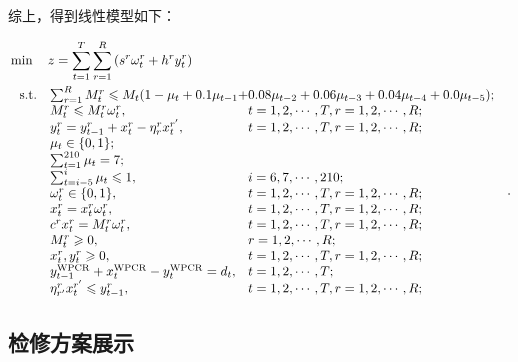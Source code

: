 综上，得到线性模型如下：

\begin{equation}\label{三模型}
	\begin{aligned}
&\min \quad z  = \sum_{t  = 1}^{T} \sum_{r = 1}^{R}\left(s^{r} \omega_{t}^{r}+h^{r} y_{t}^{r}\right)\\
& \ \begin{array}{r@{\quad}l@{}l@{\quad}l}
\mathrm{s.t. }
&	\sum_{r=1}^{R} M_{t}^{r} \leqslant M_{t}(1-\mu_{t}+0.1 \mu_{t-1}+&0.08 \mu_{t-2}+0.06 \mu_{t-3}+0.04 \mu_{t-4}+0.0 \mu_{t-5});\\
&M_{t}^{r} \leqslant M_{t}^{r} \omega_{t}^{r}, &t=1,2, \cdots, T, r=1,2, \cdots, R;\\
& y_{t}^{r}=y_{t-1}^{r}+x_{t}^{r}-\eta_{r}^{r} x_{t}^{r^{\prime}}, &t=1,2, \cdots, T,  r=1,2, \cdots, R; \\
&\mu_{t} \in\{0,1\};&\\
&\sum_{t=1}^{210}\mu_t=7;&\\
&\sum_{t=i-5}^{i} \mu_{t} \leqslant 1,& i=6,7, \cdots, 210;\\

&\omega_{t}^{r} \in\{0,1\}, &t=1,2, \cdots, T, r=1,2, \cdots, R; \\
&x_{t}^{r}=x_{t}^{r} \omega_{t}^{r},&t=1,2, \cdots, T, r=1,2, \cdots, R;\\
&c^{r} x_{t}^{r}=M_{t}^{r} \omega_{t}^{r}, &t=1,2, \cdots, T, r=1,2, \cdots, R; \\
&M_{t}^{r} \geqslant 0,& r=1,2, \cdots, R ;\\
&x_{t}^{r}, y_{t}^{r} \geqslant 0, &t=1,2, \cdots, T, r=1,2, \cdots, R;\\
&y_{t-1}^{\mathrm{WPCR}}+x_{t}^{\mathrm{WPCR}}-y_{t}^{\mathrm{WPCR}}=d_{t}, & t=1,2, \cdots, T; \\
&\eta_{r^{\prime}}^{r} x_{t}^{r^{\prime}} \leqslant y_{t-1}^{r}, &t=1,2, \cdots, T, r=1,2, \cdots, R;
\end{array}.
\end{aligned}
\end{equation}

\subsection{检修方案展示} %
\label{sub:检修方案展示}



